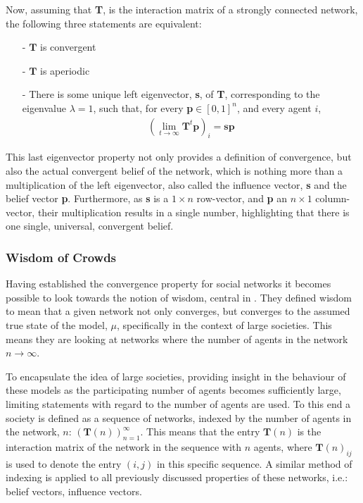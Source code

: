 \documentclass{article}
\newcommand{\T}{\textbf{T}}
\newcommand{\Soc}{(\T(n))^{\infty}_{n=1}}
\begin{document}
Now, assuming that \T, is the interaction matrix of a strongly connected network, the following three statements are equivalent:
\begin{itemize}
    \item[-] $\T$ is convergent
    \item[-] $\T$ is aperiodic
    \item[-] There is some unique left eigenvector, \textbf{s}, of \T, corresponding to the eigenvalue $\lambda=1$, such that, for every \textbf{p}$\in [0,1]^n$, and every agent $i$,
    \begin{align*}
        (\lim_{t\to\infty}\T^t\textbf{p})_i = \textbf{sp}
    \end{align*}
\end{itemize}

 This last eigenvector property not only provides a definition of convergence, but also the actual convergent belief of the network, which is nothing more than a multiplication of the left eigenvector, also called the influence vector, \textbf{s} and the belief vector \textbf{p}. Furthermore, as \textbf{s} is a $1 \times n$ row-vector, and \textbf{p} an $n \times 1$ column-vector, their multiplication results in a single number, highlighting that there is one single, universal, convergent belief.

\newpage

\subsubsection{Wisdom of Crowds}

Having established the convergence property for social networks it becomes possible to look towards the notion of wisdom, central in \cite{golub2010naive}. They defined wisdom to mean that a given network not only converges, but converges to the assumed true state of the model, $\mu$, specifically in the context of large societies. This means they are looking at networks where the number of agents in the network $n\to\infty$.

To encapsulate the idea of large societies, providing insight in the behaviour of these models as the participating number of agents becomes sufficiently large, limiting statements with regard to the number of agents are used. To this end a society is defined as a sequence of networks, indexed by the number of agents in the network, $n$: $\Soc$. This means that the entry $\textbf{T}(n)$ is the interaction matrix of the network in the sequence with $n$ agents, where $\textbf{T}(n)_{ij}$ is used to denote the entry $(i,j)$ in this specific sequence. A similar method of indexing is applied to all previously discussed properties of these networks, i.e.: belief vectors, influence vectors.
\end{document}
